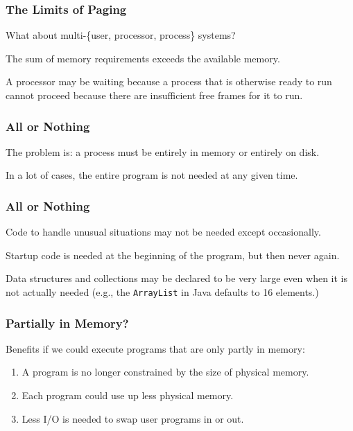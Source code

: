 \begin{frame}
\frametitle{The Limits of Paging}

What about multi-\{user, processor, process\} systems?

The sum of memory requirements exceeds the available memory. 

A processor may be waiting because a process that is otherwise ready to run cannot proceed because there are insufficient free frames for it to run.

\end{frame}

\begin{frame}
\frametitle{All or Nothing}

The problem is: a process must be entirely in memory or entirely on disk. 

In a lot of cases, the entire program is not needed at any given time. 

\end{frame}

\begin{frame}
\frametitle{All or Nothing}

Code to handle unusual situations may not be needed except occasionally.

 Startup code is needed at the beginning of the program, but then never again. 
 
Data structures and collections may be declared to be very large even when it is not actually needed (e.g., the \texttt{ArrayList} in Java defaults to 16 elements.)

\end{frame}

\begin{frame}
\frametitle{Partially in Memory?}

Benefits if we could execute programs that are only partly in memory:

\begin{enumerate}
	\item A program is no longer constrained by the size of physical memory.
	\item Each program could use up less physical memory.
	\item Less I/O is needed to swap user programs in or out.
\end{enumerate}

\end{frame}

